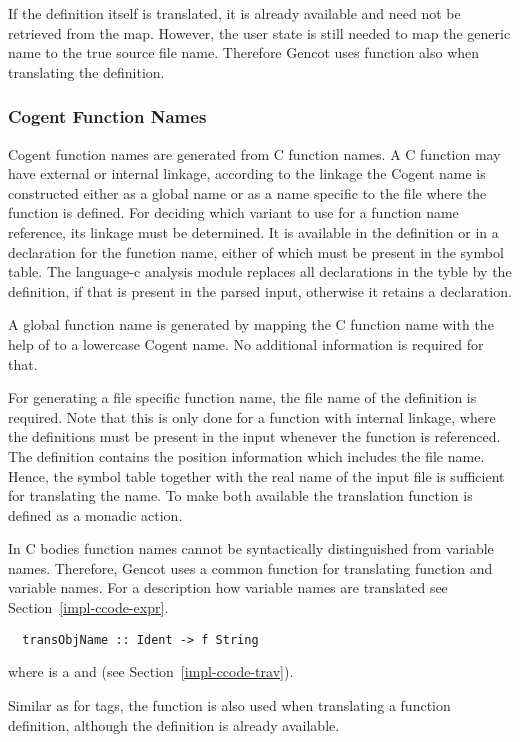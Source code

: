 If the definition itself is translated, it is already available and need not be retrieved from the map. 
However, the user state is still needed to map the generic name  to the true source file 
name. Therefore Gencot uses function  also when translating the definition.

\subsubsection{Cogent Function Names}

Cogent function names are generated from C function names. A C function may have external or internal
linkage, according to the linkage the Cogent name is constructed either as a global name or as a name specific
to the file where the function is defined. For deciding which variant to use for a function name reference,
its linkage must be determined. It is available in the definition or in a declaration for the function name,
either of which must be present in the symbol table. The language-c analysis module replaces all 
declarations in the tyble by the
definition, if that is present in the parsed input, otherwise it retains a declaration. 

A global function name is generated by mapping the C function name with the help of  to
a lowercase Cogent name. No additional information is required for that.

For generating a file specific function name, the file name of the definition is required. Note that 
this is only done for a function with internal linkage, where the definitions must be present in
the input whenever the function is referenced. The definition contains the position information
which includes the file name. Hence, the symbol table together with the real name of the input file 
is sufficient for translating the name. To make both available the translation function is defined as 
a monadic action.

In C bodies function names cannot be syntactically distinguished from variable names. Therefore, Gencot
uses a common function for translating function and variable names. For a description how variable
names are translated see Section~\ref{impl-ccode-expr}.
\begin{verbatim}
  transObjName :: Ident -> f String
\end{verbatim}
where  is a  and  (see Section~\ref{impl-ccode-trav}).

Similar as for tags, the function is also used when translating a function definition, although the 
definition is already available.

